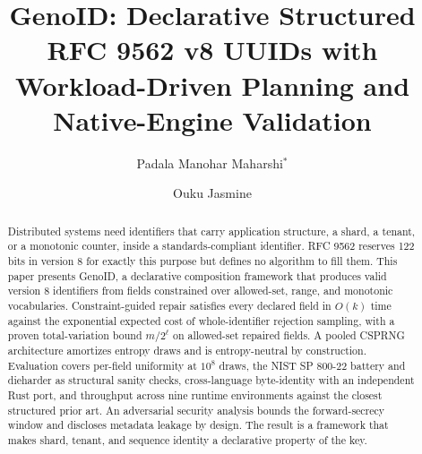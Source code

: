 \documentclass{svproc}
\begin{document}
\mainmatter

\title{GenoID: Declarative Structured RFC 9562 v8 UUIDs with Workload-Driven Planning and Native-Engine Validation}


\author{Padala Manohar Maharshi$^{*}$ \and Ouku Jasmine}



\maketitle              %

\begin{abstract}
Distributed systems need identifiers that carry application structure, a shard, a tenant, or a monotonic counter, inside a standards-compliant identifier. RFC 9562 reserves 122 bits in version 8 for exactly this purpose but defines no algorithm to fill them. This paper presents GenoID, a declarative composition framework that produces valid version 8 identifiers from fields constrained over allowed-set, range, and monotonic vocabularies. Constraint-guided repair satisfies every declared field in $O(k)$ time against the exponential expected cost of whole-identifier rejection sampling, with a proven total-variation bound $m/2^\ell$ on allowed-set repaired fields. A pooled CSPRNG architecture amortizes entropy draws and is entropy-neutral by construction. Evaluation covers per-field uniformity at $10^8$ draws, the NIST SP 800-22 battery and dieharder as structural sanity checks, cross-language byte-identity with an independent Rust port, and throughput across nine runtime environments against the closest structured prior art. An adversarial security analysis bounds the forward-secrecy window and discloses metadata leakage by design. The result is a framework that makes shard, tenant, and sequence identity a declarative property of the key.
\end{abstract}
\end{document}
